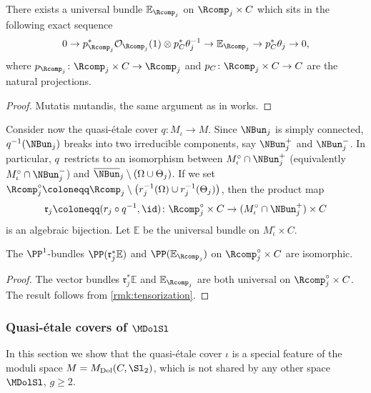 \begin{prop}\label{prop:universalbundleRj}
There exists a universal bundle $\mathbb{E}_{\Rcomp_j}$ on $\Rcomp_j \times C$ which sits in the following exact sequence
\[
0 \to p_{\Rcomp_j}^* \mathcal{O}_{\Rcomp_j}(1) \otimes p_C^*\theta^{-1}_j \to \mathbb{E}_{\Rcomp_j} \to p_C^*\theta_j \to 0,
\]
where $p_{\Rcomp_j}\colon \Rcomp_j \times C \to \Rcomp_j$ and $p_C\colon \Rcomp_j \times C \to C$ are the natural projections.
\end{prop}
\begin{proof}
Mutatis mutandis, the same argument as in \cite[p.\,22]{Thaddeus89} works.
\end{proof}

Consider now the quasi-étale cover $q\colon M_{\iota} \to M$. Since $\NBun_j$ is simply connected, $q^{-1}(\NBun_j)$ breaks into two irreducible components, say $\NBun^{+}_j$ and $\NBun^{-}_j$. In particular, $q$~restricts to an isomorphism between $M^{\circ}_{\iota} \cap \NBun^{+}_j$ (equivalently $M^{\circ}_{\iota} \cap \NBun^{-}_j$) and \hbox{$\overline{\NBun}_j \setminus( \Omega \cup \Theta_j)$}. If we set $\Rcomp^{\circ}_j \coloneqq \Rcomp_j \setminus \big(r^{-1}_j(\Omega) \cup r^{-1}_j(\Theta_j)\big)$, then the product map \begin{equation}\label{eq:Rj}
\mathfrak{r}_j \coloneqq (r_j \circ q^{-1}, \id)\colon\Rcomp^{\circ}_j \times C \to (M^{\circ}_{\iota} \cap \NBun^{+}_j) \times C
\end{equation}
is an algebraic bijection.
Let $\mathbb{E}$ be the universal bundle on $M^{\circ}_{\iota} \times C$.
\begin{lem}\label{lem:equivalenceP1bundles}
The $\PP^1$-bundles $\PP(\mathfrak{r}^*_j\mathbb{E})$ and $\PP(\mathbb{E}_{\Rcomp_j})$ on $\Rcomp^{\circ}_j \times C$ are isomorphic.
\end{lem}
\begin{proof} The vector bundles $\mathfrak{r}^*_j\mathbb{E}$ and $\mathbb{E}_{\Rcomp_j}$ are both universal on $\Rcomp^{\circ}_j \times C$. The result follows from \cref{rmk:tensorization}.
\end{proof}

\subsubsection{Quasi-étale covers of $\MDolSl$}\label{sec:quasi-etalecover}
In this section we show that the quasi-étale cover $\iota$ is a special feature of the moduli space $M={M}_{\mathrm{Dol}}(C,\Sl_2)$, which is not shared by any other space $\MDolSl$, $g \geq 2$.

